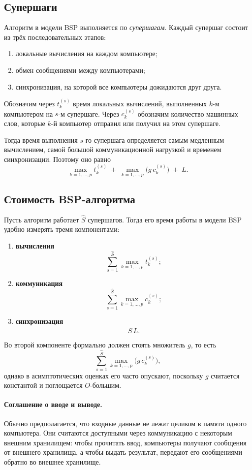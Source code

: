 \subsection{Супершаги}

Алгоритм в модели BSP выполняется по \emph{супершагам}. Каждый супершаг состоит из трёх последовательных этапов:
\begin{enumerate}
	\item локальные вычисления на каждом компьютере;
	\item обмен сообщениями между компьютерами;
	\item синхронизация, на которой все компьютеры дожидаются друг друга.
\end{enumerate}

Обозначим через \(t_k^{(s)}\) время локальных вычислений, выполненных \(k\)-м компьютером на \(s\)-м супершаге.
Через \(c_k^{(s)}\) обозначим количество машинных слов, которые \(k\)-й компьютер отправил или получил на этом супершаге.

Тогда время выполнения \(s\)-го супершага определяется самым медленным вычислением, самой большой коммуникационной нагрузкой и временем синхронизации. Поэтому оно равно
\[
\max_{k=1,\dots,p} t_k^{(s)}
\;+\;
\max_{k=1,\dots,p} \bigl(g\,c_k^{(s)}\bigr)
\;+\;
L.
\]
\subsection{Стоимость BSP-алгоритма}

Пусть алгоритм работает \(\hat S\) супершагов. Тогда его время работы в модели BSP удобно измерять тремя компонентами:
\begin{enumerate}
	\item \textbf{вычисления}
	\[
	\sum_{s=1}^{\hat S} \max_{k=1,\dots,p} t_k^{(s)};
	\]
	
	\item \textbf{коммуникация}
	\[
	\sum_{s=1}^{\hat S} \max_{k=1,\dots,p} c_k^{(s)};
	\]
	
	\item \textbf{синхронизация}
	\[
	\hat S\,L.
	\]
\end{enumerate}

Во второй компоненте формально должен стоять множитель \(g\), то есть
\[
\sum_{s=1}^{\hat S} \max_{k=1,\dots,p} \bigl(g\,c_k^{(s)}\bigr),
\]
однако в асимптотических оценках его часто опускают, поскольку \(g\) считается константой и поглощается \(O\)-большим.

\paragraph{Соглашение о вводе и выводе.}
Обычно предполагается, что входные данные не лежат целиком в памяти одного компьютера. Они считаются доступными через коммуникацию с некоторым внешним хранилищем: чтобы прочитать ввод, компьютеры получают сообщения от внешнего хранилища, а чтобы выдать результат, передают его сообщениями обратно во внешнее хранилище.

